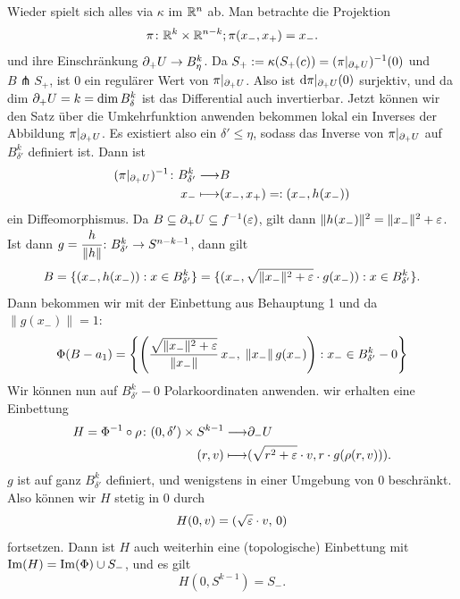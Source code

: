 \begin{bigproof}
    \begin{smallproof}
        Wieder spielt sich alles via $\kappa$ im ${ \mathbb R }^n$ ab.
        Man betrachte die Projektion
        \[ \pi \colon { \mathbb R }^k \times { \mathbb R }^{n - k} ; \pi (x_-, x_+) = x_- . \]
        und ihre Einschränkung ${ \partial }_+ U \to B_{\eta}^k$.
         Da $S_+ := \kappa(S_+(c)) = (\pi|_{{ \partial }_+U})^{-1}(0)$
        und $B \pitchfork S_+$, ist $0$ ein regulärer Wert von $\pi|_{{ \partial }_+U}$.
        Also ist ${ \operatorname{d} } \pi|_{{ \partial }_+U} (0)$ surjektiv, und da dim ${ \partial }_+U = k = \dim B^k_{\delta}$ ist
        das Differential auch invertierbar. Jetzt können wir den Satz über die Umkehrfunktion anwenden 
        bekommen lokal ein Inverses der Abbildung $\pi|_{{ \partial }_+U}$. Es existiert also ein 
        $\delta' \leq \eta$, sodass das Inverse von $\pi|_{{ \partial }_+U}$ auf $B^k_{\delta'}$ definiert 
        ist. Dann ist 
        \begin{align*}
            (\pi|_{{ \partial }_+U})^{-1} \colon B^k_{\delta'} \longrightarrow & B \\
            x_- \longmapsto & (x_-, x_+) =: (x_-, h(x_-))
        \end{align*}
        ein Diffeomorphismus. Da $B \subseteq { \partial }_+U \subseteq f^{-1}(\varepsilon)$, gilt dann 
        $\| h(x_-) \|^2 = \| x_- \|^2 + \varepsilon $. Ist dann 
        $g = \cfrac{h}{\| h \|} \colon B^k_{\delta'} \to S^{n - k - 1}$, dann gilt
        \[ B = \{ (x_-, h(x_-)): x \in B^k_{\delta'} \} 
            = \{ (x_-, \sqrt{\| x_- \|^2 + \varepsilon} \cdot g(x_-)): x \in B^k_{\delta'} \} . \]
        Dann bekommen wir mit der Einbettung aus Behauptung 1 und da $\| g(x_-) \| = 1$:
        \[ \Phi(B - a_1) = 
            \left\{ \left( \frac{\sqrt{\| x_- \|^2 + \varepsilon}}{\| x_- \|} \, x_-, \; 
                    \| x_- \| \, g(x_-) \right) : 
                x_- \in B^k_{\delta'} - 0 \right\} \]
        Wir können nun auf $B^k_{\delta'} - 0$ Polarkoordinaten anwenden. wir erhalten eine 
        Einbettung
        \begin{align*}
            H = \Phi^{-1} \circ \rho \colon (0, \delta') \times S^{k-1} \longrightarrow & { \partial }_- U \\
            (r, v) \longmapsto & ( \sqrt{r^2 + \varepsilon} \cdot v, r \cdot g(\rho(r, v))) .
        \end{align*}
        $g$ ist auf ganz $B^k_{\delta'}$ definiert, und wenigstens in einer Umgebung von $0$ 
        beschränkt. Also können wir $H$ stetig in $0$ durch
        \[ H(0, v) = (\sqrt{\varepsilon} \cdot v, \, 0) \]
        fortsetzen. Dann ist $H$ auch weiterhin eine (topologische) Einbettung mit 
        ${ \operatorname{Im} } (H) = { \operatorname{Im} } (\Phi) \cup S_- $, und es gilt 
        \[ H(0, S^{k - 1}) = S_- . \]
    \end{smallproof}


\end{bigproof}
